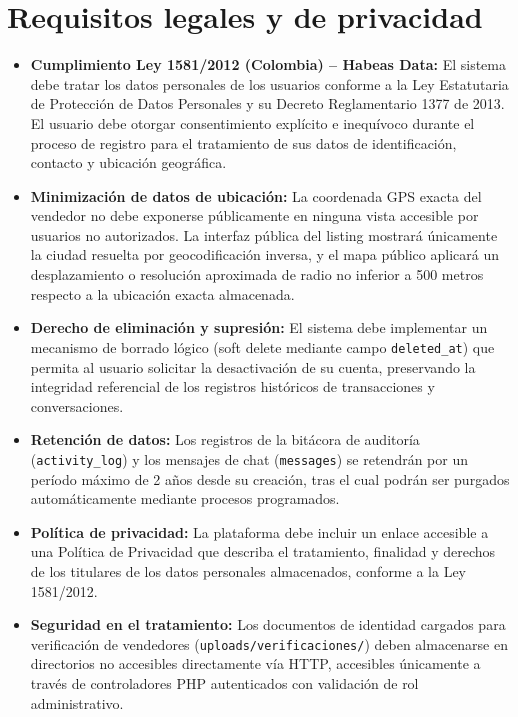 \documentclass[11pt,a4paper]{report}
\begin{document}
\section{Requisitos legales y de privacidad}
\begin{itemize}
    \item \textbf{Cumplimiento Ley 1581/2012 (Colombia) -- Habeas Data:} El sistema debe tratar los datos personales de los usuarios conforme a la Ley Estatutaria de Protección de Datos Personales y su Decreto Reglamentario 1377 de 2013. El usuario debe otorgar consentimiento explícito e inequívoco durante el proceso de registro para el tratamiento de sus datos de identificación, contacto y ubicación geográfica.
    \item \textbf{Minimización de datos de ubicación:} La coordenada GPS exacta del vendedor no debe exponerse públicamente en ninguna vista accesible por usuarios no autorizados. La interfaz pública del listing mostrará únicamente la ciudad resuelta por geocodificación inversa, y el mapa público aplicará un desplazamiento o resolución aproximada de radio no inferior a 500 metros respecto a la ubicación exacta almacenada.
    \item \textbf{Derecho de eliminación y supresión:} El sistema debe implementar un mecanismo de borrado lógico (soft delete mediante campo \texttt{deleted\_at}) que permita al usuario solicitar la desactivación de su cuenta, preservando la integridad referencial de los registros históricos de transacciones y conversaciones.
    \item \textbf{Retención de datos:} Los registros de la bitácora de auditoría (\texttt{activity\_log}) y los mensajes de chat (\texttt{messages}) se retendrán por un período máximo de 2 años desde su creación, tras el cual podrán ser purgados automáticamente mediante procesos programados.
    \item \textbf{Política de privacidad:} La plataforma debe incluir un enlace accesible a una Política de Privacidad que describa el tratamiento, finalidad y derechos de los titulares de los datos personales almacenados, conforme a la Ley 1581/2012.
    \item \textbf{Seguridad en el tratamiento:} Los documentos de identidad cargados para verificación de vendedores (\texttt{uploads/verificaciones/}) deben almacenarse en directorios no accesibles directamente vía HTTP, accesibles únicamente a través de controladores PHP autenticados con validación de rol administrativo.
\end{itemize}
\end{document}
